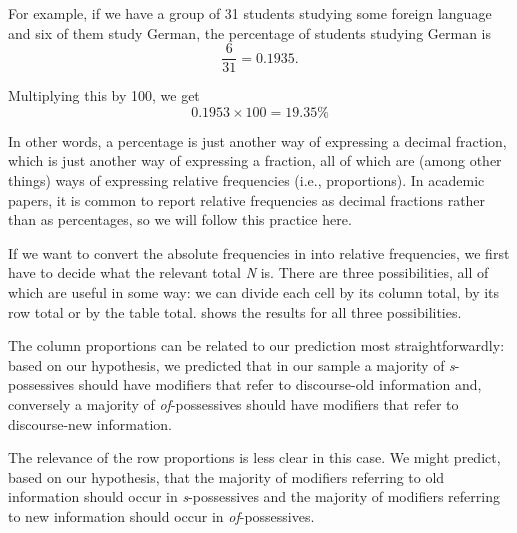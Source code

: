 For example, if we have a group of 31 students studying some foreign language and six of them study German, the percentage of students studying German is
\[\frac{6}{31} = 0.1935.\]

Multiplying this by 100, we get
\[0.1953 \times 100 = 19.35\%\]

In other words, a percentage is just another way of expressing a decimal fraction, which is just another way of expressing a fraction, all of which are (among other things) ways of expressing relative frequencies  (i.e., proportions). In academic papers, it is common to report relative frequencies as decimal fractions rather than as percentages, so we will follow this practice here.

If we want to convert the absolute frequencies  in  into relative frequencies, we first have to decide what the relevant total \emph{N} is. There are three possibilities, all of which are useful in some way: we can divide each cell by its column total, by its row total or by the table total.  shows the results for all three possibilities.

The column proportions can be related to our prediction most straightforwardly: based on our hypothesis,  we predicted that in our sample a majority of \textit{s}-possessives  should have modifiers that refer to discourse\hyp{}old information and, conversely a majority of \textit{of}-possessives  should have modifiers that refer to discourse\hyp{}new information.

The relevance of the row proportions is less clear in this case. We might predict, based on our hypothesis,  that the majority of modifiers referring to old information should occur in \textit{s}-possessives  and the majority of modifiers referring to new information should occur in \textit{of}-possessives.


